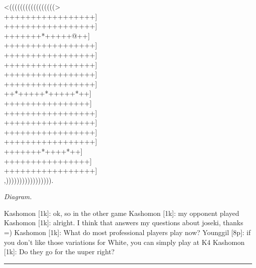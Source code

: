 \documentclass[letterpaper,12pt]{memoir}
\newcounter{GoFigure}[part]
\newcommand{\gofigure}{%
 \stepcounter{GoFigure}
 \centerline{\textit{Diagram.\thinspace\arabic{GoFigure}}}
}
\begin{document}
\begin{minipage}[t]{0.5\textwidth}
{\gnos
<(((((((((((((((((>\\
+++++++++++++++++]\\
+++++++++++++++++]\\
+++++++*+++++@++]\\
+++++++++++++++++]\\
+++++++++++++++++]\\
+++++++++++++++++]\\
+++++++++++++++++]\\
+++++++++++++++++]\\
++*+++++*+++++*++]\\
++++++++++++++++]\\
+++++++++++++++++]\\
+++++++++++++++++]\\
+++++++++++++++++]\\
+++++++++++++++++]\\
+++++++*++++*++]\\
++++++++++++++++]\\
+++++++++++++++++]\\
,))))))))))))))))).\\
}
\gofigure
\end{minipage}
\begin{minipage}[t]{0.5\textwidth}
\setlength{\parskip}{0.5em}
Kashomon [1k]: ok, so in the other game
Kashomon [1k]: my opponent played
Kashomon [1k]: alright. I think that answers my questions about joseki, thanks =)
Kashomon [1k]: What do most professional players play now? 
Younggil [8p]: if you don't like those variations for White, you can simply play at K4
Kashomon [1k]: Do they go for the uuper right?


\end{minipage}
\vfill

\rule{\textwidth}{0.5pt}
\end{document}
